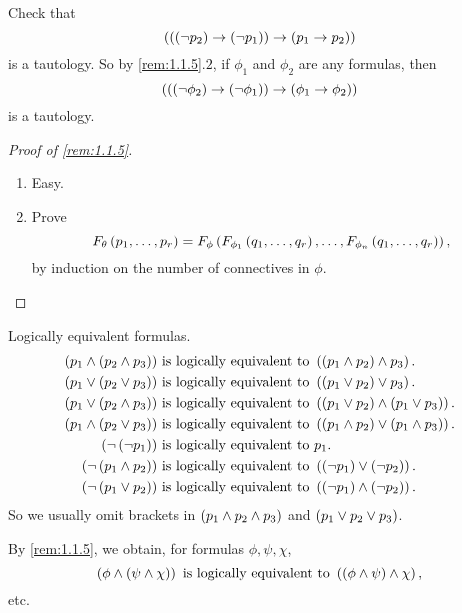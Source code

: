 \pagebreak

\begin{example}
Check that
$$ \left( \left( \left( \neg p_2 \right) \rightarrow \left( \neg p_1 \right) \right) \rightarrow \left( p_1 \rightarrow p_2 \right) \right) $$
is a tautology. So by \ref{rem:1.1.5}.$ 2 $, if $ \phi_1 $ and $ \phi_2 $ are any formulas, then
$$ \left( \left( \left( \neg \phi_2 \right) \rightarrow \left( \neg \phi_1 \right) \right) \rightarrow \left( \phi_1 \rightarrow \phi_2 \right) \right) $$
is a tautology.
\end{example}

\begin{proof}[Proof of \ref{rem:1.1.5}]
\hfill
\begin{enumerate}
\item Easy.
\item Prove
$$ F_\theta\left( p_1, \dots, p_r \right) = F_\phi\left( F_{\phi_1}\left( q_1, \dots, q_r \right), \dots, F_{\phi_n}\left( q_1, \dots, q_r \right) \right), $$
by induction on the number of connectives in $ \phi $.
\end{enumerate}
\end{proof}

\begin{example*}
Logically equivalent formulas.
\begin{align*}
\andb{p_1}{\andb{p_2}{p_3}} \ & \text{is logically equivalent to} \ \andb{\andb{p_1}{p_2}}{p_3}. \\
\orb{p_1}{\orb{p_2}{p_3}} \ & \text{is logically equivalent to} \ \orb{\orb{p_1}{p_2}}{p_3}. \\
\orb{p_1}{\andb{p_2}{p_3}} \ & \text{is logically equivalent to} \ \andb{\orb{p_1}{p_2}}{\orb{p_1}{p_3}}. \\
\andb{p_1}{\orb{p_2}{p_3}} \ & \text{is logically equivalent to} \ \orb{\andb{p_1}{p_2}}{\andb{p_1}{p_3}}. \\
\notb{\notb{p_1}} \ & \text{is logically equivalent to} \ p_1. \\
\notb{\andb{p_1}{p_2}} \ & \text{is logically equivalent to} \ \orb{\notb{p_1}}{\notb{p_2}}. \\
\notb{\orb{p_1}{p_2}} \ & \text{is logically equivalent to} \ \andb{\notb{p_1}}{\notb{p_2}}.
\end{align*}
So we usually omit brackets in $ \left( p_1 \land p_2 \land p_3 \right) $ and $ \left( p_1 \lor p_2 \lor p_3 \right) $.
\end{example*}

\begin{note*}
By \ref{rem:1.1.5}, we obtain, for formulas $ \phi, \psi, \chi $,
$$ \left( \phi \land \left( \psi \land \chi \right) \right) \ \text{is logically equivalent to} \ \left( \left( \phi \land \psi \right) \land \chi \right), $$
etc.
\end{note*}

